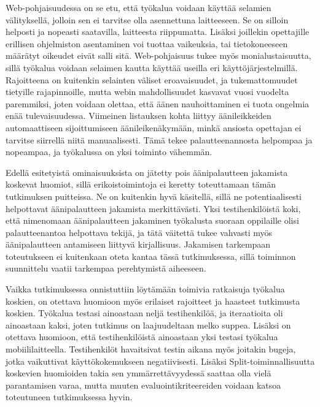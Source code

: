 \documentclass[utf8]{gradu3}
\begin{document}
Web-pohjaisuudessa on se etu, että työkalua voidaan käyttää selamien välityksellä, jolloin sen ei tarvitse olla asennettuna laitteeseen. Se on silloin helposti ja nopeasti saatavilla, laitteesta riippumatta. Lisäksi joillekin opettajille erillisen ohjelmiston asentaminen voi tuottaa vaikeuksia, tai tietokoneeseen määrätyt oikeudet eivät salli sitä. Web-pohjaisuus tukee myös monialustaisuutta, sillä työkalua voidaan selaimen kautta käyttää useilla eri käyttöjärjestelmillä. Rajoitteena on kuitenkin selainten väliset eroavaisuudet, ja tukemattomuudet tietyille rajapinnoille, mutta webin mahdollisuudet kasvavat vuosi vuodelta paremmiksi, joten voidaan olettaa, että äänen nauhoittaminen ei tuota ongelmia enää tulevaisuudessa. Viimeinen listauksen kohta liittyy äänileikkeiden automaattiseen sijoittumiseen äänileikenäkymään, minkä ansiosta opettajan ei tarvitse siirrellä niitä manuaalisesti. Tämä tekee palautteenannosta helpompaa ja nopeampaa, ja työkalussa on yksi toiminto vähemmän.  

Edellä esitetyistä ominaisuuksista on jätetty pois äänipalautteen jakamista koskevat huomiot, sillä erikoistoimintoja ei keretty toteuttamaan tämän tutkimuksen puitteissa. Ne on kuitenkin hyvä käsitellä, sillä ne potentiaalisesti helpottavat äänipalautteen jakamista merkittävästi. Yksi testihenkilöistä koki, että nimenomaan äänipalautteen jakaminen työkalusta suoraan oppilaille olisi palautteenantoa helpottava tekijä, ja tätä väitettä tukee vahvasti myös äänipalautteen antamiseen liittyvä kirjallisuus. Jakamisen tarkempaan toteutukseen ei kuitenkaan oteta kantaa tässä tutkimuksessa, sillä toiminnon suunnittelu vaatii tarkempaa perehtymistä aiheeseen.

Vaikka tutkimuksessa onnistuttiin löytämään toimivia ratkaisuja työkalua koskien, on otettava huomioon myös erilaiset rajoitteet ja haasteet tutkimusta koskien. Työkalua testasi ainoastaan neljä testihenkilöä, ja iteraatioita oli ainoastaan kaksi, joten tutkimus on laajuudeltaan melko suppea. Lisäksi on otettava huomioon, että testihenkilöistä ainoastaan yksi testasi työkalua mobiililaitteella. Testihenkilöt havaitsivat testin aikana myös joitakin bugeja, jotka vaikuttivat käyttökokemukseen negatiivisesti. Lisäksi Split-toiminnallisuutta koskevien huomioiden takia sen ymmärrettävyydessä saattaa olla vielä parantamisen varaa, mutta muuten evaluointikriteereiden voidaan katsoa toteutuneen tutkimuksessa hyvin.
\end{document}
